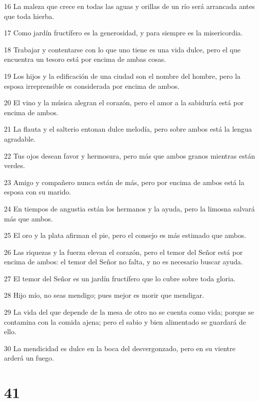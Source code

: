 \par 16 La maleza que crece en todas las aguas y orillas de un río será arrancada antes que toda hierba.
\par 17 Como jardín fructífero es la generosidad, y para siempre es la misericordia.
\par 18 Trabajar y contentarse con lo que uno tiene es una vida dulce, pero el que encuentra un tesoro está por encima de ambas cosas.
\par 19 Los hijos y la edificación de una ciudad son el nombre del hombre, pero la esposa irreprensible es considerada por encima de ambos.
\par 20 El vino y la música alegran el corazón, pero el amor a la sabiduría está por encima de ambos.
\par 21 La flauta y el salterio entonan dulce melodía, pero sobre ambos está la lengua agradable.
\par 22 Tus ojos desean favor y hermosura, pero más que ambos granos mientras están verdes.
\par 23 Amigo y compañero nunca están de más, pero por encima de ambos está la esposa con su marido.
\par 24 En tiempos de angustia están los hermanos y la ayuda, pero la limosna salvará más que ambos.
\par 25 El oro y la plata afirman el pie, pero el consejo es más estimado que ambos.
\par 26 Las riquezas y la fuerza elevan el corazón, pero el temor del Señor está por encima de ambos: el temor del Señor no falta, y no es necesario buscar ayuda.
\par 27 El temor del Señor es un jardín fructífero que lo cubre sobre toda gloria.
\par 28 Hijo mío, no seas mendigo; pues mejor es morir que mendigar.
\par 29 La vida del que depende de la mesa de otro no se cuenta como vida; porque se contamina con la comida ajena; pero el sabio y bien alimentado se guardará de ello.
\par 30 La mendicidad es dulce en la boca del desvergonzado, pero en su vientre arderá un fuego.

\chapter{41}


